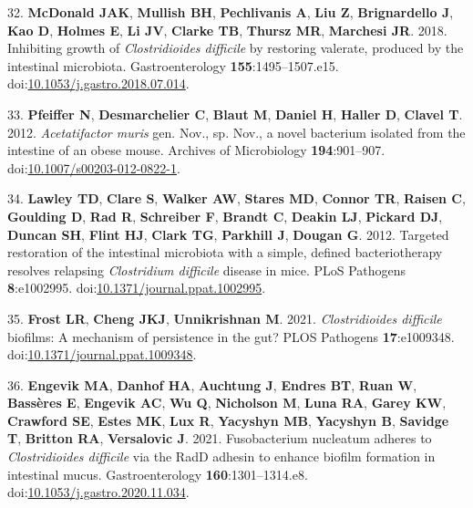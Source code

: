 \documentclass[
  11pt,
]{article}
\begin{document}
\leavevmode\hypertarget{ref-McDonald2018}{}%
32. \textbf{McDonald JAK}, \textbf{Mullish BH}, \textbf{Pechlivanis A},
\textbf{Liu Z}, \textbf{Brignardello J}, \textbf{Kao D}, \textbf{Holmes
E}, \textbf{Li JV}, \textbf{Clarke TB}, \textbf{Thursz MR},
\textbf{Marchesi JR}. 2018. Inhibiting growth of \emph{Clostridioides
difficile} by restoring valerate, produced by the intestinal microbiota.
Gastroenterology \textbf{155}:1495--1507.e15.
doi:\href{https://doi.org/10.1053/j.gastro.2018.07.014}{10.1053/j.gastro.2018.07.014}.

\leavevmode\hypertarget{ref-Pfeiffer2012}{}%
33. \textbf{Pfeiffer N}, \textbf{Desmarchelier C}, \textbf{Blaut M},
\textbf{Daniel H}, \textbf{Haller D}, \textbf{Clavel T}. 2012.
\emph{Acetatifactor muris} gen. Nov., sp. Nov., a novel bacterium
isolated from the intestine of an obese mouse. Archives of Microbiology
\textbf{194}:901--907.
doi:\href{https://doi.org/10.1007/s00203-012-0822-1}{10.1007/s00203-012-0822-1}.

\leavevmode\hypertarget{ref-Lawley2012}{}%
34. \textbf{Lawley TD}, \textbf{Clare S}, \textbf{Walker AW},
\textbf{Stares MD}, \textbf{Connor TR}, \textbf{Raisen C},
\textbf{Goulding D}, \textbf{Rad R}, \textbf{Schreiber F},
\textbf{Brandt C}, \textbf{Deakin LJ}, \textbf{Pickard DJ},
\textbf{Duncan SH}, \textbf{Flint HJ}, \textbf{Clark TG},
\textbf{Parkhill J}, \textbf{Dougan G}. 2012. Targeted restoration of
the intestinal microbiota with a simple, defined bacteriotherapy
resolves relapsing \emph{Clostridium difficile} disease in mice. PLoS
Pathogens \textbf{8}:e1002995.
doi:\href{https://doi.org/10.1371/journal.ppat.1002995}{10.1371/journal.ppat.1002995}.

\leavevmode\hypertarget{ref-Frost2021}{}%
35. \textbf{Frost LR}, \textbf{Cheng JKJ}, \textbf{Unnikrishnan M}.
2021. \emph{Clostridioides difficile} biofilms: A mechanism of
persistence in the gut? PLOS Pathogens \textbf{17}:e1009348.
doi:\href{https://doi.org/10.1371/journal.ppat.1009348}{10.1371/journal.ppat.1009348}.

\leavevmode\hypertarget{ref-Engevik2021}{}%
36. \textbf{Engevik MA}, \textbf{Danhof HA}, \textbf{Auchtung J},
\textbf{Endres BT}, \textbf{Ruan W}, \textbf{Bassères E},
\textbf{Engevik AC}, \textbf{Wu Q}, \textbf{Nicholson M}, \textbf{Luna
RA}, \textbf{Garey KW}, \textbf{Crawford SE}, \textbf{Estes MK},
\textbf{Lux R}, \textbf{Yacyshyn MB}, \textbf{Yacyshyn B},
\textbf{Savidge T}, \textbf{Britton RA}, \textbf{Versalovic J}. 2021.
Fusobacterium nucleatum adheres to \emph{Clostridioides difficile} via
the RadD adhesin to enhance biofilm formation in intestinal mucus.
Gastroenterology \textbf{160}:1301--1314.e8.
doi:\href{https://doi.org/10.1053/j.gastro.2020.11.034}{10.1053/j.gastro.2020.11.034}.
\end{document}
